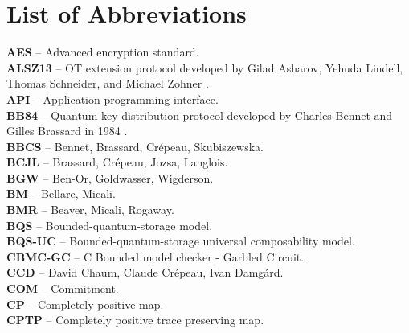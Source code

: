 \chapter*{List of Abbreviations}


\textbf{AES} -- Advanced encryption standard.
\vspace{0.5cm}\\
\textbf{ALSZ13} -- OT extension protocol developed by Gilad Asharov, Yehuda Lindell, Thomas Schneider, and Michael Zohner \cite{ALSZ13}.
\vspace{0.5cm}\\
\textbf{API} -- Application programming interface.
\vspace{0.5cm}\\
\textbf{BB84} -- Quantum key distribution protocol developed by Charles Bennet and Gilles Brassard in 1984 \cite{BB84}.
\vspace{0.5cm}\\
\textbf{BBCS} -- Bennet, Brassard, Crépeau, Skubiszewska.
\vspace{0.5cm}\\
\textbf{BCJL} -- Brassard, Crépeau, Jozsa, Langlois.
\vspace{0.5cm}\\
\textbf{BGW} -- Ben-Or, Goldwasser, Wigderson.
\vspace{0.5cm}\\
\textbf{BM} -- Bellare, Micali.
\vspace{0.5cm}\\
\textbf{BMR} -- Beaver, Micali, Rogaway.
\vspace{0.5cm}\\
\textbf{BQS} -- Bounded-quantum-storage model.
\vspace{0.5cm}\\
\textbf{BQS-UC} -- Bounded-quantum-storage universal composability model.
\vspace{0.5cm}\\
\textbf{CBMC-GC} -- C Bounded model checker - Garbled Circuit.
\vspace{0.5cm}\\
\textbf{CCD} -- David Chaum, Claude Crépeau, Ivan Damg\'{a}rd.
\vspace{0.5cm}\\
\textbf{COM} -- Commitment.
\vspace{0.5cm}\\
\textbf{CP} -- Completely positive map.
\vspace{0.5cm}\\
\textbf{CPTP} -- Completely positive trace preserving map.
